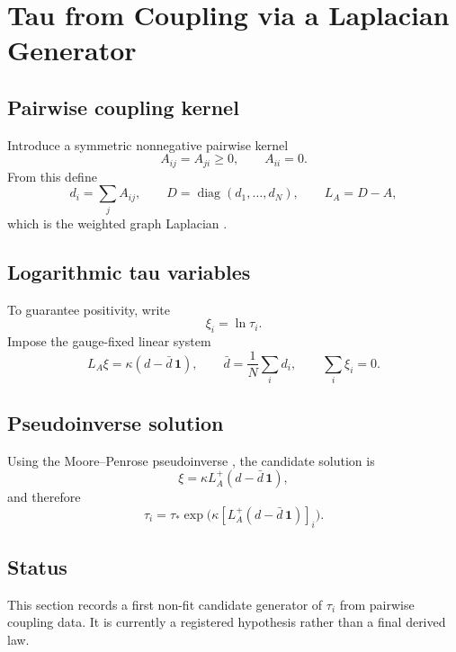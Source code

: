 \section{Tau from Coupling via a Laplacian Generator}
\label{sec:tau-from-coupling}

\subsection{Pairwise coupling kernel}
Introduce a symmetric nonnegative pairwise kernel
\begin{equation}
A_{ij}=A_{ji}\ge 0,
\qquad A_{ii}=0.
\end{equation}
From this define
\begin{equation}
d_i = \sum_j A_{ij},
\qquad D = \operatorname{diag}(d_1,\dots,d_N),
\qquad L_A = D-A,
\end{equation}
which is the weighted graph Laplacian \cite{chung1997spectralgraph,fiedler1973algebraicconnectivity}.

\subsection{Logarithmic tau variables}
To guarantee positivity, write
\begin{equation}
\xi_i = \ln\tau_i.
\end{equation}
Impose the gauge-fixed linear system
\begin{equation}
L_A\xi = \kappa(d-\bar d\,\mathbf 1),
\qquad
\bar d = \frac1N\sum_i d_i,
\qquad
\sum_i \xi_i = 0.
\end{equation}

\subsection{Pseudoinverse solution}
Using the Moore--Penrose pseudoinverse \cite{penrose1955generalizedinverse}, the candidate solution is
\begin{equation}
\xi = \kappa L_A^+(d-\bar d\,\mathbf 1),
\end{equation}
and therefore
\begin{equation}
\tau_i = \tau_*\exp\!\Big(\kappa [L_A^+(d-\bar d\,\mathbf 1)]_i\Big).
\end{equation}

\subsection{Status}
This section records a first non-fit candidate generator of $\tau_i$ from pairwise coupling data. It is currently a registered hypothesis rather than a final derived law.
